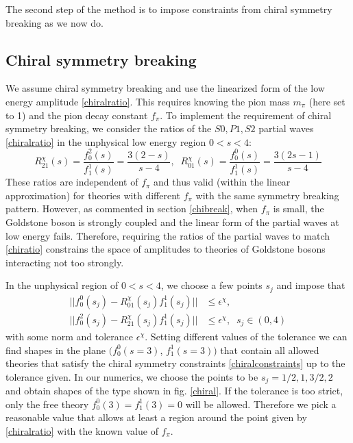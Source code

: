 \documentclass[12pt,letterpaper]{article}
\begin{document}
The second step of the method is to impose constraints from chiral symmetry breaking as we now do.


\subsection{Chiral symmetry breaking}  

 We assume chiral symmetry breaking and use the linearized form of the low energy amplitude \eqref{chiralratio}. This requires knowing the pion mass $m_\pi$ (here set to 1) and the pion decay constant $f_\pi$. To implement the requirement of chiral symmetry breaking, we consider the ratios of the $S0, P1, S2$ partial waves \eqref{chiralratio} in the unphysical low energy region $0<s<4$:
\begin{equation}\label{chiratio}
R^{\chi}_{21}(s)=\frac{f^2_0(s)}{f^1_1(s)}=\frac{3(2-s)}{s-4},\;\;R^{\chi}_{01}(s)=\frac{f^0_0(s)}{f^1_1(s)}=\frac{3(2s-1)}{s-4}
\end{equation}
These ratios are independent of $f_\pi$ and thus valid (within the linear approximation) for theories with different $f_{\pi}$ with the same symmetry breaking pattern. However, as commented in section \ref{chibreak}, when $f_{\pi}$ is small, the Goldstone boson is strongly coupled and the linear form of the partial waves at low energy fails. Therefore, requiring the ratios of the partial waves to match \eqref{chiratio} constrains the space of amplitudes to theories of Goldstone bosons interacting not too strongly.

In the unphysical region of $0<s<4$, we choose a few points $s_j$ and impose that 
\begin{equation}\label{chiralconstraints} 
	\begin{aligned}
		||f^0_0(s_j)-R^{\chi}_{01}(s_j)f^1_1(s_j)||&\le \epsilon^{\chi},\\
		||f^2_0(s_j)-R^{\chi}_{21}(s_j)f^1_1(s_j)||&\le \epsilon^{\chi},\;\; s_j\in(0,4)
	\end{aligned}
\end{equation}
with some norm and tolerance $\epsilon^\chi$. Setting different values of the tolerance we can find shapes in the plane $\big(f_0^0(s=3)$, $f_1^1(s=3)\big)$ that contain all allowed theories that satisfy the chiral symmetry constraints \eqref{chiralconstraints} up to the tolerance given. In our numerics, we choose the points to be $s_j=1/2,1,3/2,2$ and obtain shapes of the type shown in fig. \ref{chiral}. If the tolerance is too strict, only the free theory $f_0^0(3)=f_1^1(3)=0$ will be allowed. Therefore we pick a reasonable value that allows at least a region around the point given by \eqref{chiralratio} with the known value of $f_\pi$.  
\end{document}
